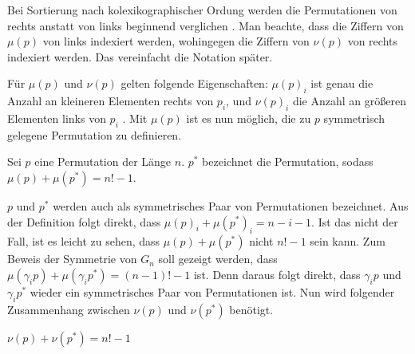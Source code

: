 \documentclass[a4paper, 10pt, ngerman]{article}
\begin{document}
Bei Sortierung nach kolexikographischer Ordung werden die Permutationen von rechts anstatt von links beginnend verglichen \cite{lexicographic}. Man beachte, dass die Ziffern von $\mu(p)$ von links indexiert werden, wohingegen die Ziffern von $\nu(p)$ von rechts indexiert werden. Das vereinfacht die Notation später.

Für $\mu(p)$ und $\nu(p)$ gelten folgende Eigenschaften: $\mu(p)_i$ ist genau die Anzahl an kleineren Elementen rechts von $p_i$, und $\nu(p)_i$ die Anzahl an größeren Elementen links von $p_i$ \cite{factorial}. Mit $\mu(p)$ ist es nun möglich, die zu $p$ symmetrisch gelegene Permutation zu definieren.

\begin{definition}
    Sei $p$ eine Permutation der Länge $n$. $p^*$ bezeichnet die Permutation, sodass $\mu(p) + \mu(p^*) = n! - 1$.
\end{definition}

$p$ und $p^*$ werden auch als symmetrisches Paar von Permutationen bezeichnet. Aus der Definition folgt direkt, dass $\mu(p)_i + \mu(p^*)_i = n - i - 1$. Ist das nicht der Fall, ist es leicht zu sehen, dass $\mu(p) + \mu(p^*)$ nicht $n! - 1$ sein kann. Zum Beweis der Symmetrie von $G_n$ soll gezeigt werden, dass $\mu(\gamma_i p) + \mu(\gamma_i p^*) = (n - 1)! - 1$ ist. Denn daraus folgt direkt, dass $\gamma_i p$ und $\gamma_i p^*$ wieder ein symmetrisches Paar von Permutationen ist. Nun wird folgender Zusammenhang zwischen $\nu(p)$ und $\nu(p^*)$ benötigt.

\begin{lemma}
    $\nu(p) + \nu(p^*) = n! - 1$ 
\end{lemma}
\end{document}
